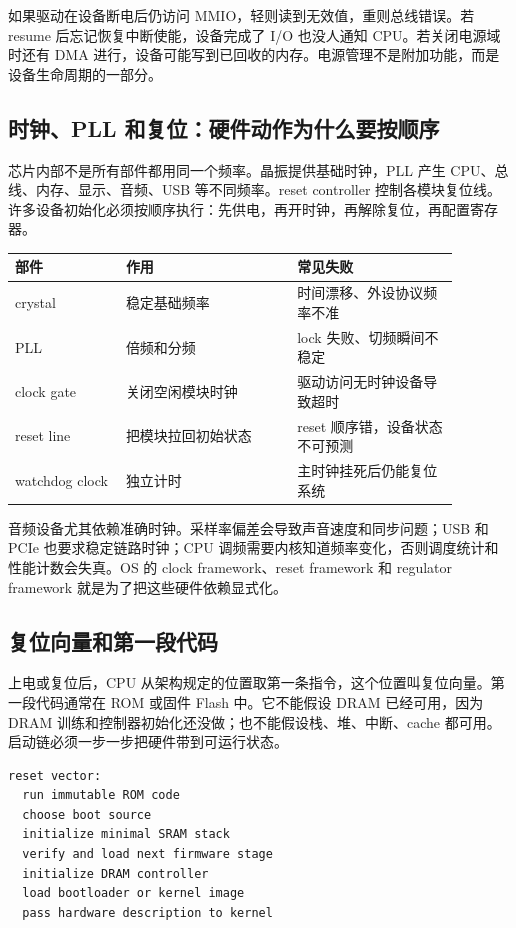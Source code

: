 如果驱动在设备断电后仍访问 MMIO，轻则读到无效值，重则总线错误。若 resume 后忘记恢复中断使能，设备完成了 I/O 也没人通知 CPU。若关闭电源域时还有 DMA 进行，设备可能写到已回收的内存。电源管理不是附加功能，而是设备生命周期的一部分。

\subsection{时钟、PLL 和复位：硬件动作为什么要按顺序}

芯片内部不是所有部件都用同一个频率。晶振提供基础时钟，PLL 产生 CPU、总线、内存、显示、音频、USB 等不同频率。reset controller 控制各模块复位线。许多设备初始化必须按顺序执行：先供电，再开时钟，再解除复位，再配置寄存器。

\begin{longtable}{p{0.22\linewidth}p{0.34\linewidth}p{0.32\linewidth}}
\toprule
部件 & 作用 & 常见失败 \\
\midrule
crystal & 稳定基础频率 & 时间漂移、外设协议频率不准 \\
PLL & 倍频和分频 & lock 失败、切频瞬间不稳定 \\
clock gate & 关闭空闲模块时钟 & 驱动访问无时钟设备导致超时 \\
reset line & 把模块拉回初始状态 & reset 顺序错，设备状态不可预测 \\
watchdog clock & 独立计时 & 主时钟挂死后仍能复位系统 \\
\bottomrule
\end{longtable}

音频设备尤其依赖准确时钟。采样率偏差会导致声音速度和同步问题；USB 和 PCIe 也要求稳定链路时钟；CPU 调频需要内核知道频率变化，否则调度统计和性能计数会失真。OS 的 clock framework、reset framework 和 regulator framework 就是为了把这些硬件依赖显式化。

\subsection{复位向量和第一段代码}

上电或复位后，CPU 从架构规定的位置取第一条指令，这个位置叫复位向量。第一段代码通常在 ROM 或固件 Flash 中。它不能假设 DRAM 已经可用，因为 DRAM 训练和控制器初始化还没做；也不能假设栈、堆、中断、cache 都可用。启动链必须一步一步把硬件带到可运行状态。

\begin{lstlisting}
reset vector:
  run immutable ROM code
  choose boot source
  initialize minimal SRAM stack
  verify and load next firmware stage
  initialize DRAM controller
  load bootloader or kernel image
  pass hardware description to kernel
\end{lstlisting}

